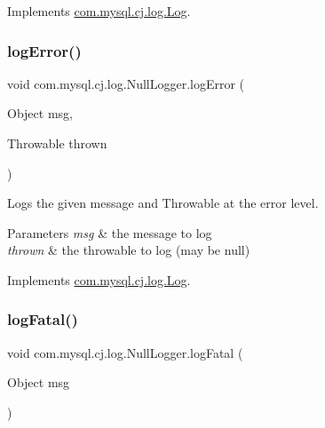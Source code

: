Implements \mbox{\hyperlink{interfacecom_1_1mysql_1_1cj_1_1log_1_1_log_ab6f35d1efab89f0c0316106fa4a15d2c}{com.\+mysql.\+cj.\+log.\+Log}}.

\mbox{\label{classcom_1_1mysql_1_1cj_1_1log_1_1_null_logger_a5e2cc9bc22d59ed5f1531cb73b3b48c5}} 
\subsubsection{\texorpdfstring{log\+Error()}{logError()}\hspace{0.1cm}{\footnotesize\ttfamily [2/2]}}
{\footnotesize\ttfamily void com.\+mysql.\+cj.\+log.\+Null\+Logger.\+log\+Error (\begin{DoxyParamCaption}\item[{Object}]{msg,  }\item[{Throwable}]{thrown }\end{DoxyParamCaption})}

Logs the given message and Throwable at the \textquotesingle{}error\textquotesingle{} level.


\begin{DoxyParams}{Parameters}
{\em msg} & the message to log \\
\hline
{\em thrown} & the throwable to log (may be null) \\
\hline
\end{DoxyParams}


Implements \mbox{\hyperlink{interfacecom_1_1mysql_1_1cj_1_1log_1_1_log_a96aab6e63a2ab9ebe3b640b7e253dd4f}{com.\+mysql.\+cj.\+log.\+Log}}.

\mbox{\label{classcom_1_1mysql_1_1cj_1_1log_1_1_null_logger_a68d852a1b707ebdbf2288d9e4a1c0335}} 
\subsubsection{\texorpdfstring{log\+Fatal()}{logFatal()}\hspace{0.1cm}{\footnotesize\ttfamily [1/2]}}
{\footnotesize\ttfamily void com.\+mysql.\+cj.\+log.\+Null\+Logger.\+log\+Fatal (\begin{DoxyParamCaption}\item[{Object}]{msg }\end{DoxyParamCaption})}


